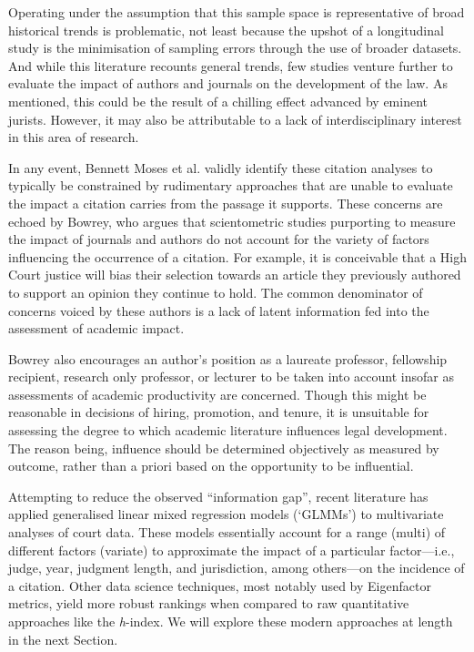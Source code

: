 Operating under the assumption that this sample space is representative of broad historical trends is problematic, not least because the upshot of a longitudinal study is the minimisation of sampling errors through the use of broader datasets. And while this literature recounts general trends, few studies venture further to evaluate the impact of authors and journals on the development of the law. As mentioned, this could be the result of a chilling effect advanced by eminent jurists. However, it may also be attributable to a lack of interdisciplinary interest in this area of research.

In any event, Bennett Moses et al. validly identify these citation analyses to typically be constrained by rudimentary approaches that are unable to evaluate the impact a citation carries from the passage it supports. These concerns are echoed by Bowrey, who argues that scientometric studies purporting to measure the impact of journals and authors do not account for the variety of factors influencing the occurrence of a citation. For example, it is conceivable that a High Court justice will bias their selection towards an article they previously authored to support an opinion they continue to hold. The common denominator of concerns voiced by these authors is a lack of latent information fed into the assessment of academic impact.

Bowrey also encourages an author's position as a laureate professor, fellowship recipient, research only professor, or lecturer to be taken into account insofar as assessments of academic productivity are concerned. Though this might be reasonable in decisions of hiring, promotion, and tenure, it is unsuitable for assessing the degree to which academic literature influences legal development. The reason being, influence should be determined objectively as measured by outcome, rather than a priori based on the opportunity to be influential.

Attempting to reduce the observed ``information gap'', recent literature has applied generalised linear mixed regression models (`GLMMs') to multivariate analyses of court data. These models essentially account for a range (multi) of different factors (variate) to approximate the impact of a particular factor---i.e., judge, year, judgment length, and jurisdiction, among others---on the incidence of a citation. Other data science techniques, most notably used by Eigenfactor metrics, yield more robust rankings when compared to raw quantitative approaches like the \textit{h}-index. We will explore these modern approaches at length in the next Section.
